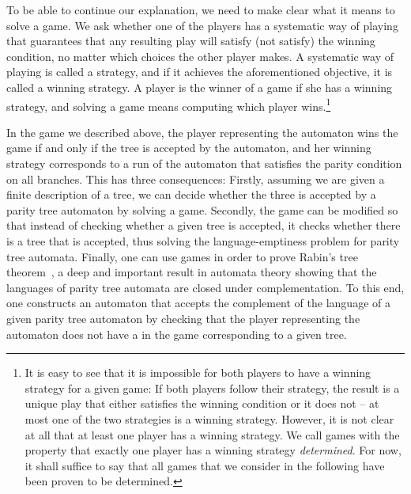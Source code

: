 \documentclass[../../diss.tex]{subfiles}
\begin{document}
To be able to continue our explanation, we need to make clear what it means to solve a game.
We ask whether one of the players has a systematic way of playing that guarantees that any resulting play will satisfy (\resp not satisfy) the winning condition, no matter which choices the other player makes.
A systematic way of playing is called a strategy, and if it achieves the aforementioned objective, it is called a winning strategy.
A player is the winner of a game if she has a winning strategy, and solving a game means computing which player wins.\footnote{%
It is easy to see that it is impossible for both players to have a winning strategy for a given game: If both players follow their strategy, the result is a unique play that either satisfies the winning condition or it does not -- at most one of the two strategies is a winning strategy.
    However, it is not clear  at all that at least one player has a winning strategy.
    We call games with the property that exactly one player has a winning strategy \emph{determined}.
    For now, it shall suffice to say that all games that we consider in the following have been proven to be determined.
}

In the game we described above, the player representing the automaton wins the game if and only if the tree is accepted by the automaton, and her winning strategy corresponds to a run of the automaton that satisfies the parity condition on all branches.
This has three consequences:
Firstly, assuming we are given a finite description of a tree, we can decide whether the three is accepted by a parity tree automaton by solving a game.
Secondly, the game can be modified so that instead of checking whether a given tree is accepted, it checks whether there is a tree that is accepted, thus solving the language-emptiness problem for parity tree automata.
Finally, one can use games in order to prove Rabin's tree theorem~\cite{Rabin68,Zielonka98}, a deep and important result in automata theory showing that the languages of parity tree automata are closed under complementation.
To this end, one constructs an automaton that accepts the complement of the language of a given parity tree automaton by checking that the player representing the automaton does not have a  in the game corresponding to a given tree.
\end{document}
